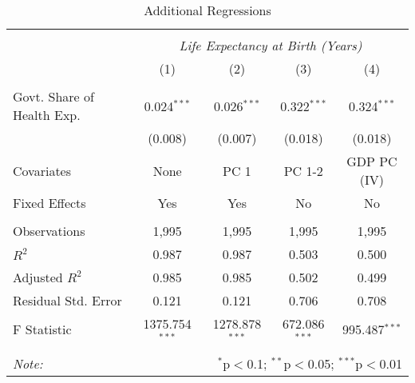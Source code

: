 \begin{table}[!htbp] \centering
  \caption{Additional Regressions \label{additional_regs}}
\begin{tabular}{@{\extracolsep{5pt}}lcccc}
\\[-1.8ex]\hline
\hline \\[-1.8ex]
& \multicolumn{4}{c}{\textit{Life Expectancy at Birth (Years)}} \
\cr \
\\[-1.8ex] & (1) & (2) & (3) & (4) \\
\hline \\[-1.8ex]
 Govt. Share of Health Exp. & 0.024$^{***}$ & 0.026$^{***}$ & 0.322$^{***}$ & 0.324$^{***}$ \\
  & (0.008) & (0.007) & (0.018) & (0.018) \\
 Covariates & None & PC 1 & PC 1-2 & GDP PC (IV) \\
 Fixed Effects & Yes & Yes & No & No \\
\hline \\[-1.8ex]
 Observations & 1,995 & 1,995 & 1,995 & 1,995 \\
 $R^2$ & 0.987 & 0.987 & 0.503 & 0.500 \\
 Adjusted $R^2$ & 0.985 & 0.985 & 0.502 & 0.499 \\
 Residual Std. Error & 0.121 & 0.121 & 0.706 & 0.708  \\
 F Statistic & 1375.754$^{***}$  & 1278.878$^{***}$  & 672.086$^{***}$  & 995.487$^{***}$  \\
\hline
\hline \\[-1.8ex]
\textit{Note:} & \multicolumn{4}{r}{$^{*}$p$<$0.1; $^{**}$p$<$0.05; $^{***}$p$<$0.01} \\
\end{tabular}
\end{table}